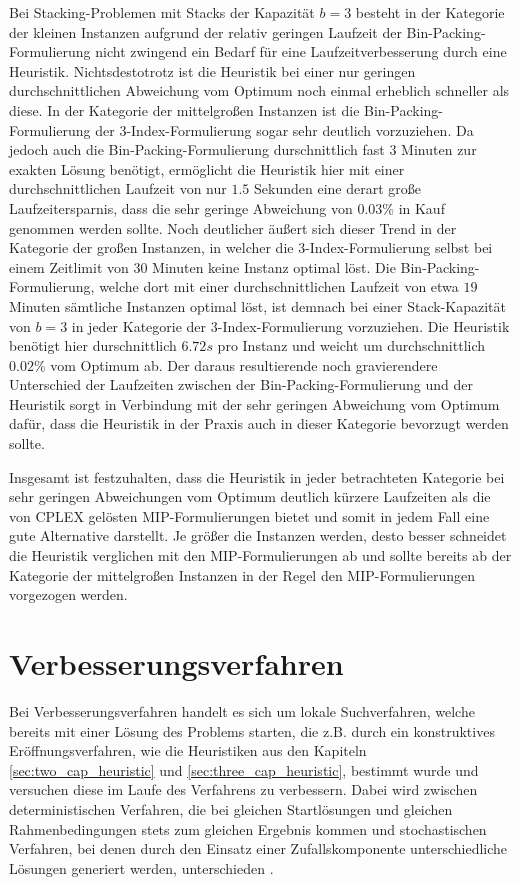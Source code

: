 Bei Stacking-Problemen mit Stacks der Kapazität $b = 3$ besteht in der Kategorie der kleinen Instanzen
aufgrund der relativ geringen Laufzeit der Bin-Packing-Formulierung nicht zwingend ein Bedarf für eine
Laufzeitverbesserung durch eine Heuristik. Nichtsdestotrotz ist die Heuristik bei einer nur geringen
durchschnittlichen Abweichung vom Optimum noch einmal erheblich schneller als diese.
In der Kategorie der mittelgroßen Instanzen ist die Bin-Packing-Formulierung der 3-Index-Formulierung sogar
sehr deutlich vorzuziehen. Da jedoch auch die Bin-Packing-Formulierung durschnittlich fast $3$ Minuten zur exakten Lösung benötigt, ermöglicht die Heuristik hier mit einer durchschnittlichen Laufzeit von nur $1.5$ Sekunden eine derart große Laufzeitersparnis, dass die sehr geringe Abweichung von $0.03 \%$ in Kauf genommen werden sollte.
Noch deutlicher äußert sich dieser Trend in der Kategorie der großen Instanzen, in welcher die 3-Index-Formulierung
selbst bei einem Zeitlimit von $30$ Minuten keine Instanz optimal löst. Die Bin-Packing-Formulierung, welche dort
mit einer durchschnittlichen Laufzeit von etwa $19$ Minuten sämtliche Instanzen optimal löst,
ist demnach bei einer Stack-Kapazität von $b = 3$ in jeder Kategorie der 3-Index-Formulierung vorzuziehen.
Die Heuristik benötigt hier durschnittlich $6.72s$ pro Instanz und weicht um durchschnittlich $0.02 \%$ vom Optimum ab.
Der daraus resultierende noch gravierendere Unterschied der Laufzeiten zwischen der Bin-Packing-Formulierung und
der Heuristik sorgt in Verbindung mit der sehr geringen Abweichung vom Optimum dafür, dass die Heuristik in der Praxis
auch in dieser Kategorie bevorzugt werden sollte.

Insgesamt ist festzuhalten, dass die Heuristik in jeder betrachteten Kategorie bei sehr geringen Abweichungen
vom Optimum deutlich kürzere Laufzeiten als die von \textsc{CPLEX} gelösten MIP-Formulierungen bietet und somit in
jedem Fall eine gute Alternative darstellt. Je größer die Instanzen werden, desto besser schneidet die Heuristik
verglichen mit den MIP-Formulierungen ab und sollte bereits ab der Kategorie der mittelgroßen Instanzen in der Regel
den MIP-Formulierungen vorgezogen werden.

\section{Verbesserungsverfahren}
\label{sec:post_optimization}

Bei Verbesserungsverfahren handelt es sich um lokale Suchverfahren, welche bereits mit einer Lösung des Problems starten, die z.B. durch ein konstruktives Eröffnungsverfahren, wie die Heuristiken aus den Kapiteln \ref{sec:two_cap_heuristic} und \ref{sec:three_cap_heuristic}, bestimmt wurde und versuchen diese im Laufe des Verfahrens zu verbessern. Dabei wird zwischen deterministischen Verfahren, die bei gleichen Startlösungen und gleichen Rahmenbedingungen stets zum gleichen Ergebnis kommen und stochastischen Verfahren, bei denen durch den Einsatz einer Zufallskomponente unterschiedliche Lösungen generiert werden, unterschieden \cite{Knust2017}.

